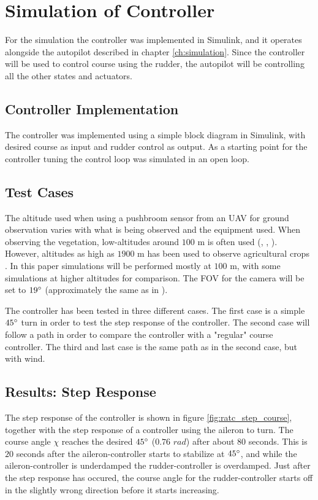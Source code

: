 \section{Simulation of Controller}

For the simulation the controller was implemented in Simulink, and it operates alongside the autopilot described in chapter \ref{ch:simulation}. Since the controller will be used to control course using the rudder, the autopilot will be controlling all the other states and actuators.


\subsection{Controller Implementation}

The controller was implemented using a simple block diagram in Simulink, with desired course as input and rudder control as output. As a starting point for the controller tuning the control loop was simulated in an open loop. 

\subsection{Test Cases}


The altitude used when using a pushbroom sensor from an UAV for ground observation varies with what is being observed and the equipment used. When observing the vegetation, low-altitudes around $100$ m is often used (\cite{hymsySUOMALAINEN}, \cite{wheatLELONG}, \cite{lowRAMIREZ}). However, altitudes as high as $1900$ m has been used to observe agricultural crops \cite{mosaicASMAT}. In this paper simulations will be performed mostly at $100$ m, with some simulations at higher altitudes for comparison. The FOV for the camera will be set to $19\degree$ (approximately the same as in \cite{hymsySUOMALAINEN}).

The controller has been tested in three different cases. The first case is a simple $45\degree$ turn in order to test the step response of the controller. The second case will follow a path in order to compare the controller with a "regular" course controller. The third and last case is the same path as in the second case, but with wind.


\subsection{Results: Step Response}

The step response of the controller is shown in figure \ref{fig:ratc_step_course}, together with the step response of a controller using the aileron to turn. The course angle $\chi$ reaches the desired $45\degree$ ($0.76$ $rad$) after about $80$ seconds. This is $20$ seconds after the aileron-controller starts to stabilize at $45\degree$, and while the aileron-controller is underdamped the rudder-controller is overdamped. Just after the step response has occured, the course angle for the rudder-controller starts off in the slightly wrong direction before it starts increasing.

